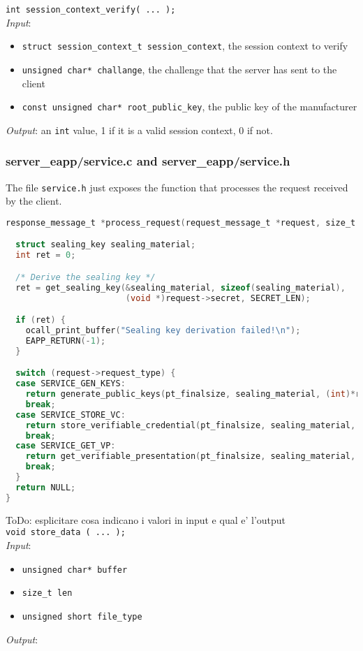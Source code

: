 \noindent
\texttt{int session\_context\_verify( ... );}\\
\textit{Input}:
\begin{itemize}[noitemsep,nolistsep]
  \item \texttt{struct session\_context\_t session\_context}, the session context to verify
  \item \texttt{unsigned char* challange}, the challenge that the server has sent to the client
  \item \texttt{const unsigned char* root\_public\_key}, the public key of the manufacturer
\end{itemize}
\textit{Output}: an \texttt{int} value, 1 if it is a valid session context, 0 if not.

\subsubsection{server\_eapp/service.c and server\_eapp/service.h}
The file \texttt{service.h} just exposes the function that processes the request received by the client.  
\begin{lstlisting}[language=C,frame=single]
response_message_t *process_request(request_message_t *request, size_t *pt_finalsize) {

  struct sealing_key sealing_material;
  int ret = 0;

  /* Derive the sealing key */
  ret = get_sealing_key(&sealing_material, sizeof(sealing_material),
                        (void *)request->secret, SECRET_LEN);

  if (ret) {
    ocall_print_buffer("Sealing key derivation failed!\n");
    EAPP_RETURN(-1);
  }

  switch (request->request_type) {
  case SERVICE_GEN_KEYS:
    return generate_public_keys(pt_finalsize, sealing_material, (int)*request->payload - '0');
    break;
  case SERVICE_STORE_VC:
    return store_verifiable_credential(pt_finalsize, sealing_material, request->payload, request->len);
    break;
  case SERVICE_GET_VP:
    return get_verifiable_presentation(pt_finalsize, sealing_material, request->payload, request->len);
    break;
  }
  return NULL;
}
\end{lstlisting}
{\color{red} ToDo: esplicitare cosa indicano i valori in input e qual e' l'output}\\
\noindent
\texttt{void store\_data ( ... );}\\
\textit{Input}:
\begin{itemize}[noitemsep,nolistsep]
  \item \texttt{unsigned char* buffer}
  \item \texttt{size\_t len}
  \item \texttt{unsigned short file\_type}
\end{itemize}
\textit{Output}: 

